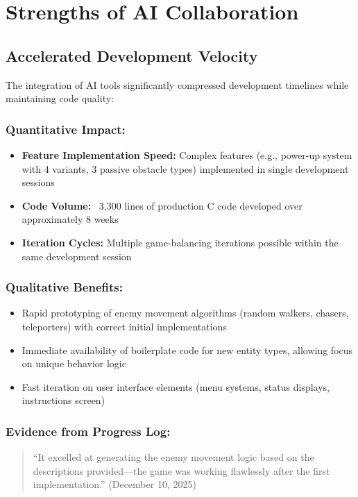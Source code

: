 \documentclass[12pt,a4paper]{article}
\begin{document}
\newpage

\section{Strengths of AI Collaboration}

\subsection{Accelerated Development Velocity}

The integration of AI tools significantly compressed development timelines while maintaining code quality:

\subsubsection*{Quantitative Impact:}
\begin{itemize}
    \item \textbf{Feature Implementation Speed:} Complex features (e.g., power-up system with 4 variants, 3 passive obstacle types) implemented in single development sessions
    \item \textbf{Code Volume:} ~3,300 lines of production C code developed over approximately 8 weeks
    \item \textbf{Iteration Cycles:} Multiple game-balancing iterations possible within the same development session
\end{itemize}

\subsubsection*{Qualitative Benefits:}
\begin{itemize}
    \item Rapid prototyping of enemy movement algorithms (random walkers, chasers, teleporters) with correct initial implementations
    \item Immediate availability of boilerplate code for new entity types, allowing focus on unique behavior logic
    \item Fast iteration on user interface elements (menu systems, status displays, instructions screen)
\end{itemize}

\subsubsection*{Evidence from Progress Log:}
\begin{quote}
``It excelled at generating the enemy movement logic based on the descriptions provided---the game was working flawlessly after the first implementation.'' (December 10, 2025)
\end{quote}
\end{document}
